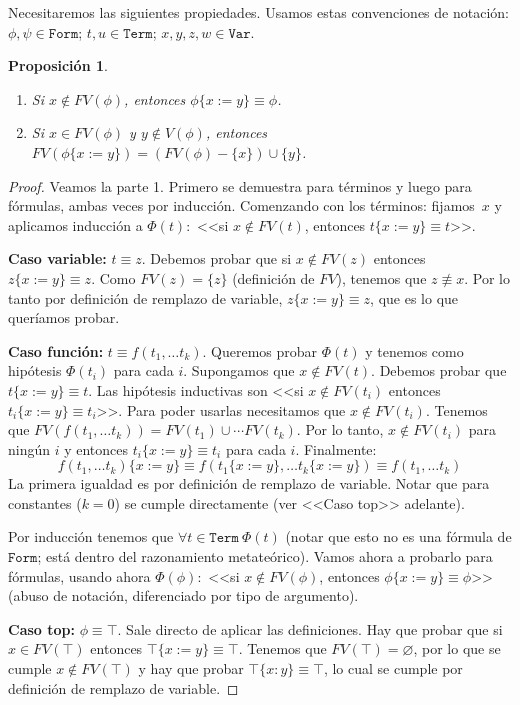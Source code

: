 \documentclass[a4paper, 12pt]{report}
\newtheorem{prop}[teorema]{Proposición}
\theoremstyle{definition}
\begin{document}
Necesitaremos las siguientes propiedades. Usamos estas convenciones de notación: $\phi,\psi\in\mathtt{Form}$; $t,u\in\mathtt{Term}$; $x,y,z,w\in\mathtt{Var}$.

\begin{prop}\label{prop-remplVar1}
	\begin{enumerate}
		\item Si $x\not\in FV(\phi)$, entonces $\phi\{x:=y\}\equiv\phi$.
		\item Si $x\in FV(\phi)$ y $y\not\in V(\phi)$, entonces $FV(\phi\{x:=y\})=(FV(\phi)-\{x\})\cup\{y\}$.
	\end{enumerate}
\end{prop}
\begin{proof}
	Veamos la parte 1. Primero se demuestra para términos y luego para fórmulas, ambas veces por inducción. Comenzando con los términos: fijamos~$x$ y  aplicamos inducción a $\Phi(t):$ <<si $x\not\in FV(t)$, entonces $t\{x:=y\}\equiv t$>>.
	
	\textbf{Caso variable:} $t\equiv z$. Debemos probar que si $x\not\in FV(z)$ entonces $z\{x:=y\}\equiv z$. Como $FV(z)=\{z\}$ (definición de $FV$), tenemos que $z\not\equiv x$. Por lo tanto por definición de remplazo de variable, $z\{x:=y\}\equiv z$, que es lo que queríamos probar.
	
	\textbf{Caso función:} $t\equiv f(t_1,\dots t_k)$. Queremos probar $\Phi(t)$ y tenemos como hipótesis $\Phi(t_i)$ para cada $i$. Supongamos que $x\not\in FV(t)$. Debemos probar que $t\{x:=y\}\equiv t$. Las hipótesis inductivas son <<si $x\not\in FV(t_i)$ entonces $t_i\{x:=y\}\equiv t_i$>>. Para poder usarlas necesitamos que $x\not\in FV(t_i)$. Tenemos que $FV(f(t_1,\dots t_k))=FV(t_1)\cup\cdots FV(t_k)$. Por lo tanto, $x\not\in FV(t_i)$ para ningún $i$ y entonces $t_i\{x:=y\}\equiv t_i$ para cada $i$. Finalmente:
	$$ f(t_1,\dots t_k)\{x:=y\}\equiv f(t_1\{x:=y\},\dots t_k\{x:=y\}) \equiv f(t_1,\dots t_k)
	$$
	La primera igualdad es por definición de remplazo de variable. Notar que para constantes ($k=0$) se cumple directamente (ver <<Caso top>> adelante).
	
	Por inducción tenemos que $\forall t\in\mathtt{Term}~\Phi(t)$ (notar que esto no es una fórmula de $\mathtt{Form}$; está dentro del razonamiento metateórico). Vamos ahora a probarlo para fórmulas, usando ahora $\Phi(\phi):$ <<si $x\not\in FV(\phi)$, entonces $\phi\{x:=y\}\equiv \phi$>> (abuso de notación, diferenciado por tipo de argumento).
	
	\textbf{Caso top:} $\phi\equiv\top$. Sale directo de aplicar las definiciones. Hay que probar que si $x\in FV(\top)$ entonces $\top\{x:=y\}\equiv\top$. Tenemos que $FV(\top)=\varnothing$, por lo que se cumple $x\not\in FV(\top)$ y hay que probar $\top\{x:y\}\equiv\top$, lo cual se cumple por definición de remplazo de variable.
	

\end{proof}
\end{document}
